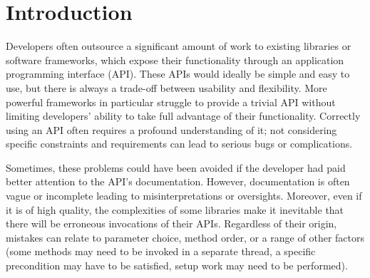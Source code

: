 \chapter{Introduction}\label{ch:intro}

Developers often outsource a significant amount of work to existing libraries or software frameworks, which expose their functionality through an application programming interface (API).
These APIs would ideally be simple and easy to use, but there is always a trade-off between usability and flexibility.
More powerful frameworks in particular struggle to provide a trivial API without limiting developers' ability to take full advantage of their functionality.
Correctly using an API often requires a profound understanding of it;
not considering specific constraints and requirements can lead to serious bugs or complications.

Sometimes, these problems could have been avoided if the developer had paid better attention to the API's documentation.
However, documentation is often vague or incomplete leading to misinterpretations or oversights.
Moreover, even if it is of high quality, the complexities of some libraries make it inevitable that there will be erroneous invocations of their APIs.
Regardless of their origin, mistakes can relate to parameter choice, method order, or a range of other factors (some methods may need to be invoked in a separate thread, a specific precondition may have to be satisfied, setup work may need to be performed).

